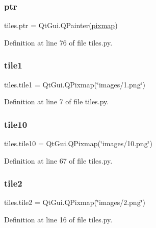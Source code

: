\subsubsection{\texorpdfstring{ptr}{ptr}}
{\footnotesize\ttfamily tiles.\+ptr = Qt\+Gui.\+Q\+Painter(\mbox{\hyperlink{namespacetiles_a2f61bf9f6911ee0493b484f713df252f}{pixmap}})}



Definition at line 76 of file tiles.\+py.

\mbox{\label{namespacetiles_a6cdc4269e5f00586b2ae64520ebc4ca7}} 
\subsubsection{\texorpdfstring{tile1}{tile1}}
{\footnotesize\ttfamily tiles.\+tile1 = Qt\+Gui.\+Q\+Pixmap(\char`\"{}images/1.png\char`\"{})}



Definition at line 7 of file tiles.\+py.

\mbox{\label{namespacetiles_a67b2b0c7f78614262653eed92e0cbd16}} 
\subsubsection{\texorpdfstring{tile10}{tile10}}
{\footnotesize\ttfamily tiles.\+tile10 = Qt\+Gui.\+Q\+Pixmap(\char`\"{}images/10.png\char`\"{})}



Definition at line 67 of file tiles.\+py.

\mbox{\label{namespacetiles_a7976b31b4d032a09e47054a6c1a1b11d}} 
\subsubsection{\texorpdfstring{tile2}{tile2}}
{\footnotesize\ttfamily tiles.\+tile2 = Qt\+Gui.\+Q\+Pixmap(\char`\"{}images/2.png\char`\"{})}



Definition at line 16 of file tiles.\+py.

\mbox{\label{namespacetiles_a0fa6a8935e546e55741280d0030c08f0}} 
